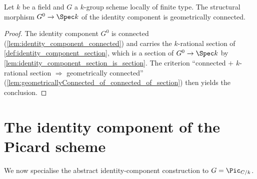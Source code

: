 \begin{lemma}

  \label{lem:identity_component_geometrically_connected}
  Let \(k\) be a field and \(G\) a \(k\)-group scheme locally of finite
  type. The structural morphism \(G^0 \to \Spec k\) of the identity
  component is geometrically connected.
\end{lemma}
\begin{proof}
  \leanok
  The identity component \(G^0\) is connected
  (\cref{lem:identity_component_connected}) and carries the \(k\)-rational
  section of \cref{def:identity_component_section}, which is a section of
  \(G^0 \to \Spec k\) by \cref{lem:identity_component_section_is_section}.
  The criterion ``connected \(+\) \(k\)-rational section \(\Rightarrow\)
  geometrically connected''
  (\cref{lem:geometricallyConnected_of_connected_of_section}) then yields
  the conclusion.
\end{proof}

\section{The identity component of the Picard scheme}
\label{sec:pic0_definition}

We now specialise the abstract identity-component construction to
\(G = \Pic_{C/k}\).

